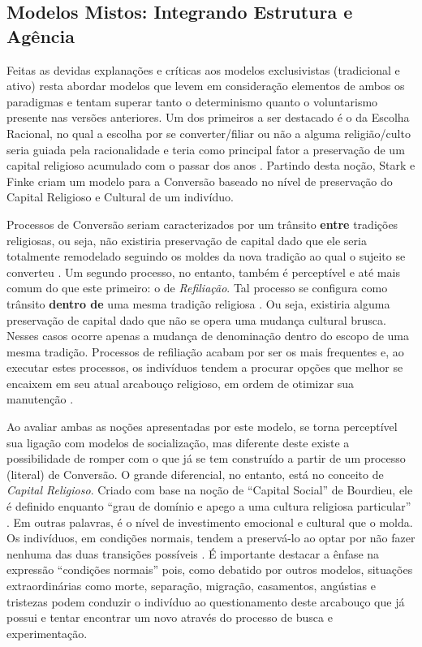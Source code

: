 \documentclass[
	12pt,				%
	oneside,			%
	a4paper,			%
	sumario=tradicional,
	english,			%
	brazil				%
	]{abntex2}
\begin{document}
\hypertarget{modelos-mistos-integrando-estrutura-e-aguxeancia}{%
\subsection{Modelos Mistos: Integrando Estrutura e Agência}\label{modelos-mistos-integrando-estrutura-e-aguxeancia}}

Feitas as devidas explanações e críticas aos modelos exclusivistas (tradicional e ativo) resta abordar modelos que levem em consideração elementos de ambos os paradigmas e tentam superar tanto o determinismo quanto o voluntarismo presente nas versões anteriores. Um dos primeiros a ser destacado é o da Escolha Racional, no qual a escolha por se converter/filiar ou não a alguma religião/culto seria guiada pela racionalidade e teria como principal fator a preservação de um capital religioso acumulado com o passar dos anos \autocite[119]{stark_acts_2000-1}. Partindo desta noção, Stark e Finke criam um modelo para a Conversão baseado no nível de preservação do Capital Religioso e Cultural de um indivíduo.

Processos de Conversão seriam caracterizados por um trânsito \textbf{entre} tradições religiosas, ou seja, não existiria preservação de capital dado que ele seria totalmente remodelado seguindo os moldes da nova tradição ao qual o sujeito se converteu \autocite[114]{stark_acts_2000-1}. Um segundo processo, no entanto, também é perceptível e até mais comum do que este primeiro: o de \emph{Refiliação}. Tal processo se configura como trânsito \textbf{dentro de} uma mesma tradição religiosa \autocite[114]{stark_acts_2000-1}. Ou seja, existiria alguma preservação de capital dado que não se opera uma mudança cultural brusca. Nesses casos ocorre apenas a mudança de denominação dentro do escopo de uma mesma tradição. Processos de refiliação acabam por ser os mais frequentes e, ao executar estes processos, os indivíduos tendem a procurar opções que melhor se encaixem em seu atual arcabouço religioso, em ordem de otimizar sua manutenção \autocite[123]{stark_acts_2000-1}.

Ao avaliar ambas as noções apresentadas por este modelo, se torna perceptível sua ligação com modelos de socialização, mas diferente deste existe a possibilidade de romper com o que já se tem construído a partir de um processo (literal) de Conversão. O grande diferencial, no entanto, está no conceito de \emph{Capital Religioso}. Criado com base na noção de ``Capital Social'' de Bourdieu, ele é definido enquanto ``grau de domínio e apego a uma cultura religiosa particular'' \autocite[120]{stark_acts_2000-1}. Em outras palavras, é o nível de investimento emocional e cultural que o molda. Os indivíduos, em condições normais, tendem a preservá-lo ao optar por não fazer nenhuma das duas transições possíveis \autocite[121]{stark_acts_2000-1}. É importante destacar a ênfase na expressão ``condições normais'' pois, como debatido por outros modelos, situações extraordinárias como morte, separação, migração, casamentos, angústias e tristezas podem conduzir o indivíduo ao questionamento deste arcabouço que já possui e tentar encontrar um novo através do processo de busca e experimentação.
\end{document}
